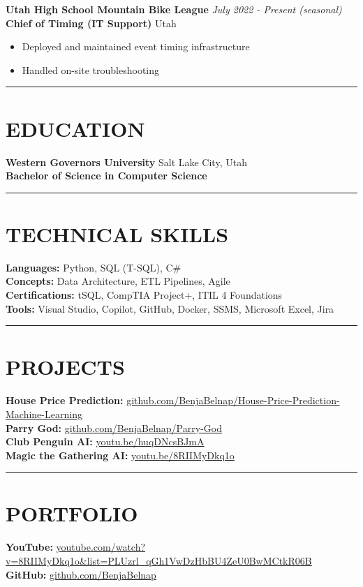 \documentclass[11pt]{article}
\begin{document}
\textbf{Utah High School Mountain Bike League} \hfill \textit{July 2022 - Present (seasonal)}\\
\textbf{Chief of Timing (IT Support)} \hfill Utah
\begin{itemize}
    \item Deployed and maintained event timing infrastructure
    \item Handled on-site troubleshooting
\end{itemize}

{\color{accent}\rule{\textwidth}{1pt}}

\section*{{\color{accent}EDUCATION}}

\textbf{Western Governors University} \hfill Salt Lake City, Utah\\
\textbf{Bachelor of Science in Computer Science}

{\color{accent}\rule{\textwidth}{1pt}}

\section*{{\color{accent}TECHNICAL SKILLS}}

\textbf{Languages:} Python, SQL (T-SQL), C\#\\
\textbf{Concepts:} Data Architecture, ETL Pipelines, Agile\\
\textbf{Certifications:} tSQL, CompTIA Project+, ITIL 4 Foundations\\
\textbf{Tools:} Visual Studio, Copilot, GitHub, Docker, SSMS, Microsoft Excel, Jira

{\color{accent}\rule{\textwidth}{1pt}}

\section*{{\color{accent}PROJECTS}}

\textbf{House Price Prediction:} \href{https://github.com/BenjaBelnap/House-Price-Prediction-Machine-Learning}{github.com/BenjaBelnap/House-Price-Prediction-Machine-Learning}\\
\textbf{Parry God:} \href{https://github.com/BenjaBelnap/Parry-God}{github.com/BenjaBelnap/Parry-God}\\
\textbf{Club Penguin AI:} \href{https://youtu.be/huqDNcsBJmA?si=JeCqGqGiTHdY9so1}{youtu.be/huqDNcsBJmA}\\
\textbf{Magic the Gathering AI:} \href{https://youtu.be/8RIIMyDkq1o?si=IFQelgHKwUcTemNc}{youtu.be/8RIIMyDkq1o}

{\color{accent}\rule{\textwidth}{1pt}}

\section*{{\color{accent}PORTFOLIO}}

\textbf{YouTube:} \href{https://www.youtube.com/watch?v=8RIIMyDkq1o&list=PLUzrl_qGh1VwDzHbBU4ZeU0BwMCtkR06B}{youtube.com/watch?v=8RIIMyDkq1o\&list=PLUzrl\_qGh1VwDzHbBU4ZeU0BwMCtkR06B}\\
\textbf{GitHub:} \href{https://github.com/BenjaBelnap}{github.com/BenjaBelnap}
\end{document}
